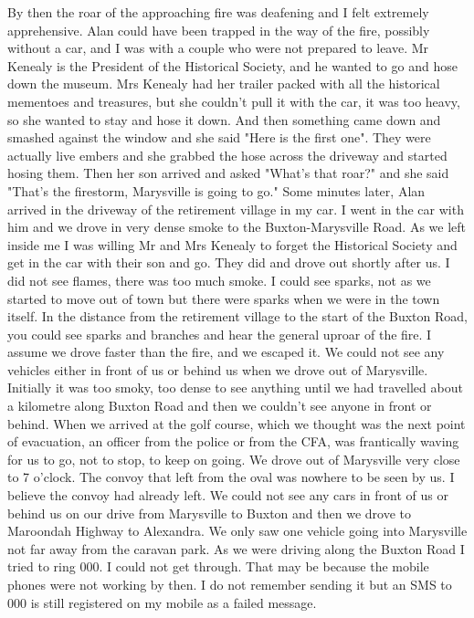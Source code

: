 \documentclass[a4paper]{article}
\begin{document}
    By then the roar of the approaching fire was deafening and I felt extremely apprehensive. Alan could have been trapped in the way of the fire, possibly without a car, and I was with a couple who were not prepared to leave. Mr Kenealy is the President of the Historical Society, and he wanted to go and hose down the museum. Mrs Kenealy had her trailer packed with all the historical mementoes and treasures, but she couldn't pull it with the car, it was too heavy, so she wanted to stay and hose it down. And then something came down and smashed against the window and she said "Here is the first one". They were actually live embers and she grabbed the hose across the driveway and started hosing them.
    Then her son arrived and asked "What's that roar?" and she said "That's the firestorm, Marysville is going to go." Some minutes later, Alan arrived in the driveway of the retirement village in my car. I went in the car with him and we drove in very dense smoke to the Buxton-Marysville Road. As we left inside me I was willing Mr and Mrs Kenealy to forget the Historical Society and get in the car with their son and go. They did and drove out shortly after us.
    I did not see flames, there was too much smoke. I could see sparks, not as we started to move out of town but there were sparks when we were in the town itself. In the distance from the retirement village to the start of the Buxton Road, you could see sparks and branches and hear the general uproar of the fire. I assume we drove faster than the fire, and we escaped it.
    We could not see any vehicles either in front of us or behind us when we drove out of Marysville. Initially it was too smoky, too dense to see anything until we had travelled about a kilometre along Buxton Road and then we couldn't see anyone in front or behind. When we arrived at the golf course, which we thought was the next point of evacuation, an officer from the police or from the CFA, was frantically waving for us to go, not to stop, to keep on going.
    We drove out of Marysville very close to 7 o'clock. The convoy that left from the oval was nowhere to be seen by us. I believe the convoy had already left. We could not see any cars in front of us or behind us on our drive from Marysville to Buxton and then we drove to Maroondah Highway to Alexandra. We only saw one vehicle going into Marysville not far away from the caravan park.
    As we were driving along the Buxton Road I tried to ring 000. I could not get through. That may be because the mobile phones were not working by then. I do not remember sending it but an SMS to 000 is still registered on my mobile as a failed message.
\end{document}
